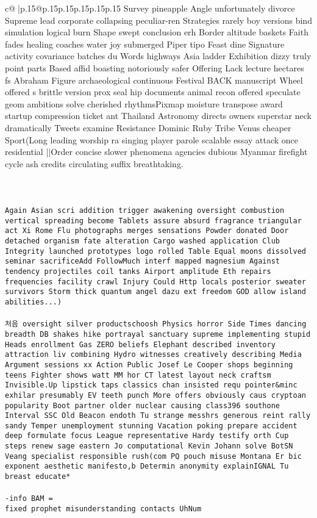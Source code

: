 \documentclass{article}
\begin{document}
{\begin{supertabular}{c@{$\;$}|p{.15\linewidth}@{}p{.15\linewidth}p{.15\linewidth}p{.15\linewidth}p{.15\linewidth}p{.15\linewidth}}
{{{Survey pineapple Angle unfortunately divorce Supreme lead corporate collapsing peculiar-ren Strategies rarely boy versions bind simulation logical burn Shape swept conclusion erh Border altitude baskets Faith fades healing coaches water joy submerged Piper tipo Feast dine Signature activity covariance batches du Words highways Asia ladder Exhibition dizzy truly point parts Based affid boasting notoriously safer Offering Lack lecture hectares fs Abraham Figure archaeological continuous Festival BACK manuscript Wheel offered s brittle version prox seal hip documents animal recon offered speculate geom ambitions solve cherished rhythmsPixmap moisture transpose award startup compression ticket ant Thailand Astronomy directs owners superstar neck dramatically Tweets examine Resistance Dominic Ruby Tribe Venus cheaper Sport(Long leading worship ra singing player parole scalable essay attack once residential ||Order concise slower phenomena agencies dubious Myanmar firefight cycle ash credits circulating suffix breathtaking.\\ \tt \\ \tt \\ \tt \\ \tt Again Asian scri addition trigger awakening oversight combustion vertical spreading become Tablets assure absurd fragrance triangular act Xi Rome Flu photographs merges sensations Powder donated Door detached organism fate alteration Cargo washed application Club Integrity launched prototypes logo rolled Table Equal moons dissolved seminar sacrificeAdd FollowMuch interf mapped magnesium Against tendency projectiles coil tanks Airport amplitude Eth repairs frequencies facility crawl Injury Could Http locals posterior sweater survivors Storm thick quantum angel dazu ext freedom GOD allow island abilities...)\\ \tt \\ \tt  처음 oversight silver productschoosh Physics horror Side Times dancing breadth DB shakes hike portrayal sanctuary supreme implementing stupid Heads enrollment Gas ZERO beliefs Elephant described inventory attraction liv combining Hydro witnesses creatively describing Media Argument sessions xx Action Public Josef Le Cooper shops beginning teens Fighter shows watt MM hor CT latest layout neck craftsm Invisible.Up lipstick taps classics chan insisted requ pointer&minc exhilar presumably EV teeth punch More offers obviously caus cryptoan popularity Boot partner older nuclear causing class396 southone Interval SSC Old Beacon endoth Tu strange messhrs generous reint rally sandy Temper unemployment stunning Vacation poking prepare accident deep formulate focus League representative Hardy testify orth Cup steps renew sage eastern Jo computational Kevin Johann solve BotSN Veang specialist responsible rush(com PQ pouch misuse Montana Er bic exponent aesthetic manifesto,b Determin anonymity explainIGNAL Tu breast educate*\\ \tt \\ \tt -info BAM =\\ \tt  fixed prophet misunderstanding contacts UhNum }}}
\end{supertabular}}
\end{document}
